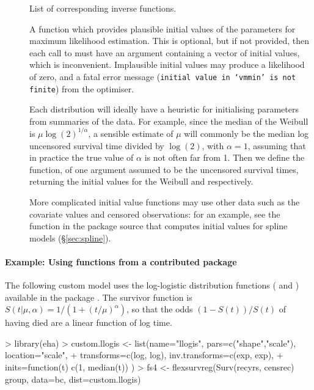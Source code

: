 \documentclass[nojss,nofooter]{jss}
\begin{document}
\begin{description}
\item[] List of corresponding inverse functions.

\item[] A function which provides plausible initial values
  of the parameters for maximum likelihood estimation.  This is
  optional, but if not provided, then each call to 
  must have an  argument containing a vector of initial
  values, which is inconvenient.  Implausible initial values may
  produce a likelihood of zero, and a fatal error message
  (\texttt{initial value in `vmmin' is not finite}) from the
  optimiser.
  
  Each distribution will ideally have a heuristic for initialising
  parameters from summaries of the data.  For example, since the
  median of the Weibull is $\mu \log(2)^{1/\alpha}$, a sensible
  estimate of $\mu$ will commonly be the median log uncensored
  survival time divided by $\log(2)$, with $\alpha=1$, assuming that
  in practice the true value of $\alpha$ is not often far from 1.  Then
  we define the function, of one argument  assumed to be the
  uncensored survival times, returning the initial values for the
  Weibull  and  respectively.

  
  More complicated initial value functions may use other data such
  as the covariate values and censored observations: for an example,
  see the function  in the package source
  that computes initial values for spline models
  (\S\ref{sec:spline}).

\end{description}
    
\paragraph{Example: Using functions from a contributed package}

The following custom model uses the log-logistic distribution functions
( and ) available in the package
.   The survivor function is $S(t|\mu,\alpha) = 1/(1 + (t/\mu)^\alpha)$,
so that the odds $(1-S(t))/S(t)$ of having died are a linear function of log time.
\begin{Schunk}
\begin{Sinput}
> library(eha)
> custom.llogis <- list(name="llogis",  pars=c("shape","scale"), location="scale",
+                       transforms=c(log, log), inv.transforms=c(exp, exp),
+                       inits=function(t){ c(1, median(t)) })
> fs4 <- flexsurvreg(Surv(recyrs, censrec) ~ group, data=bc, dist=custom.llogis)
\end{Sinput}
\end{Schunk}
\end{document}
